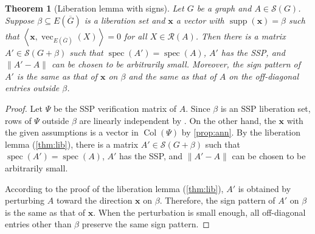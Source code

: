 \documentclass{article}
\newtheorem{theorem}{Theorem}[section]
\theoremstyle{definition}
\newcommand{\trans}{^\top}
\newcommand{\inp}[2]{\left\langle#1,#2\right\rangle}
\newcommand{\bx}{\mathbf{x}}
\newcommand{\tr}{\operatorname{tr}}
\newcommand{\Col}{\operatorname{Col}}
\newcommand{\spec}{\operatorname{spec}}
\newcommand{\mptn}{\mathcal{S}}
\newcommand{\vsupp}{\operatorname{supp}}
\newcommand{\mvec}{\operatorname{vec}}
\begin{document}

\begin{theorem}[Liberation lemma with signs]
\label{thm:libsign}
Let $G$ be a graph and $A\in\mptn(G)$.  Suppose $\beta\subseteq E(\overline{G})$ is a liberation set and $\bx$ a vector with $\vsupp(\bx) = \beta$ such that $\inp{\bx}{\mvec_{E(\overline{G})}(X)} = 0$ for all $X\in\mathcal{R}(A)$.  Then there is a matrix $A'\in\mptn(G + \beta)$ such that $\spec(A') = \spec(A)$, $A'$ has the SSP, and $\|A' - A\|$ can  be chosen to be arbitrarily small.  Moreover, the sign pattern of $A'$ is the same as that of $\bx$ on $\beta$ and the same as that of $A$ on the off-diagonal entries outside $\beta$.
\end{theorem}
\begin{proof}
Let $\Psi$ be the SSP verification matrix of $A$.  Since $\beta$ is an SSP liberation set, rows of $\Psi$ outside $\beta$ are linearly independent by \cite[Proposition~2.6]{LiberationG}.  On the other hand, the $\bx$ with the given assumptions is a vector in $\Col(\Psi)$ by \cref{prop:ann}.  By the liberation lemma (\cref{thm:lib}), there is a matrix $A'\in\mptn(G + \beta)$ such that $\spec(A') = \spec(A)$, $A'$ has the SSP, and $\|A' - A\|$ can be chosen to be arbitrarily small.

According to the proof of the liberation lemma (\cref{thm:lib}), $A'$ is obtained by perturbing $A$ toward the direction $\bx$ on $\beta$.  Therefore, the sign pattern of $A'$ on $\beta$ is the same as that of $\bx$.  When the perturbation is small enough, all off-diagonal entries other than $\beta$ preserve the same sign pattern.
\end{proof}
\end{document}
